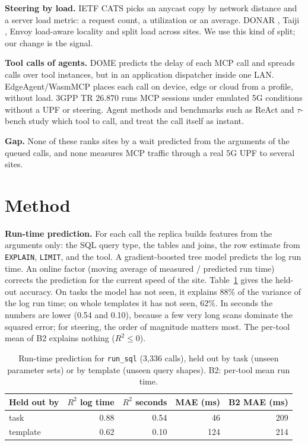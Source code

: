 \documentclass{article}
\begin{document}
\textbf{Steering by load.} IETF CATS \citep{cats_rfc,cats_metrics} picks an anycast copy by
network distance and a server load metric: a request count, a utilization or an average.
DONAR \citep{donar}, Taiji \citep{taiji}, Envoy load-aware locality \citep{envoy} and
\citet{fan2018} split load across sites. We use this kind of split; our change is the
signal.

\textbf{Tool calls of agents.} DOME \citep{dome} predicts the delay of each MCP call and
spreads calls over tool instances, but in an application dispatcher inside one LAN.
EdgeAgent/WasmMCP \citep{edgeagent} places each call on device, edge or cloud from a
profile, without load. 3GPP TR 26.870 \citep{tr26870} runs MCP sessions under emulated 5G
conditions without a UPF or steering. Agent methods and
benchmarks such as ReAct \citep{react} and $\tau$-bench \citep{taubench} study which tool
to call, and treat the call itself as instant.

\textbf{Gap.} None of these ranks sites by a wait predicted from the arguments of the
queued calls, and none measures MCP traffic through a real 5G UPF to several sites.

\section{Method}
\label{sec:method}
\textbf{Run-time prediction.} For each call the replica builds features from the arguments
only: the SQL query type, the tables and joins, the row estimate from \texttt{EXPLAIN},
\texttt{LIMIT}, and the tool. A gradient-boosted tree model \citep{lightgbm} predicts the
log run time. An online factor (moving average of measured / predicted run time) corrects
the prediction for the current speed of the site. Table~\ref{tab:r2} gives the held-out
accuracy. On tasks the model has not seen, it explains 88\% of the variance of the log run
time; on whole templates it has not seen, 62\%. In seconds the numbers are lower (0.54 and
0.10), because a few very long scans dominate the squared error; for steering, the order
of magnitude matters most. The per-tool mean of B2 explains nothing ($R^2\le 0$).

\begin{table}[t]
\centering
\caption{Run-time prediction for \texttt{run\_sql} (3,336 calls), held out by task (unseen
parameter sets) or by template (unseen query shapes). B2: per-tool mean run time.}
\label{tab:r2}
\small
\begin{tabular}{lrrrr}
\toprule
Held out by & $R^2$ log time & $R^2$ seconds & MAE (ms) & B2 MAE (ms) \\
\midrule
task & 0.88 & 0.54 & 46 & 209 \\
template & 0.62 & 0.10 & 124 & 214 \\
\bottomrule
\end{tabular}
\end{table}
\end{document}
